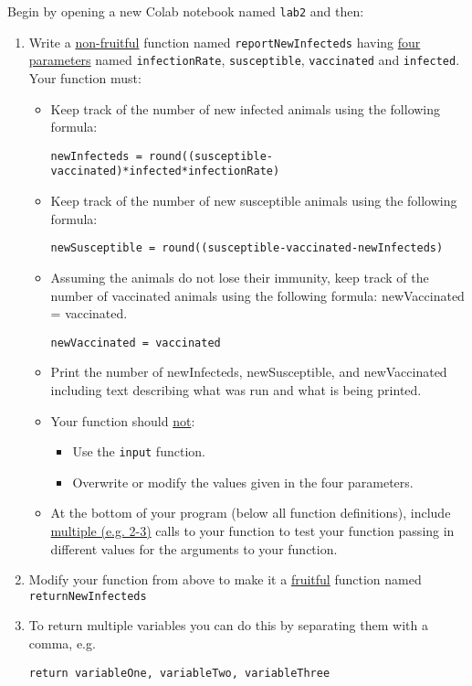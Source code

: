 \documentclass[10pt]{article}
\begin{document}
  Begin by opening a new Colab notebook named {\tt lab2} and then:
  \begin{enumerate}
    \item Write a \uline{non-fruitful} function named {\tt reportNewInfecteds} having
      \uline{four parameters} named {\tt infectionRate}, {\tt susceptible}, {\tt vaccinated} and {\tt infected}.
      Your function must:
      \begin{itemize}
        \item Keep track of the number of new infected animals using the following formula: 
      \begin{Verbatim}[commandchars=\\\{\}]
         newInfecteds = round((susceptible-vaccinated)*infected*infectionRate)
      \end{Verbatim}
        \item Keep track of the number of new susceptible animals using the following formula: 
      \begin{Verbatim}[commandchars=\\\{\}]
         newSusceptible = round((susceptible-vaccinated-newInfecteds)
      \end{Verbatim}
        
        \item Assuming the animals do not lose their immunity, keep track of the number of vaccinated animals using the following formula: newVaccinated = vaccinated.

      \begin{Verbatim}[commandchars=\\\{\}]
         newVaccinated = vaccinated
      \end{Verbatim}
        
        \item Print the number of newInfecteds, newSusceptible, and newVaccinated including text describing what was run and what is being printed.
        \item Your function should \uline{not}:
            \begin{itemize}
                \item Use the {\tt input} function.
                \item Overwrite or modify the values given in the four parameters.
            \end{itemize}
        \item At the bottom of your program (below all function definitions),
        include \uline{multiple (e.g. 2-3)} calls to your function to test your function
        passing in different values for the arguments to your function.
      \end{itemize}
    \item Modify your function from above to make it a \uline{fruitful} function named {\tt returnNewInfecteds}
    \item To return multiple variables you can do this by separating them with a comma, e.g. 
       \begin{Verbatim}[commandchars=\\\{\}]
         return variableOne, variableTwo, variableThree
      \end{Verbatim}   
    

\end{enumerate}
\end{document}
